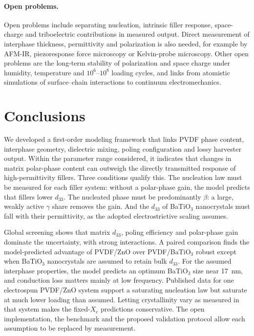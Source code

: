 \documentclass[11pt,a4paper]{article}
\newcommand{\BTO}{BaTiO$_3$}
\newcommand{\dt}{d_{33}}
\begin{document}
\paragraph{Open problems.} Open problems include separating nucleation, intrinsic filler response, space-charge and triboelectric contributions in measured output. Direct measurement of interphase thickness, permittivity and polarization is also needed, for example by AFM-IR, piezoresponse force microscopy or Kelvin-probe microscopy. Other open problems are the long-term stability of polarization and space charge under humidity, temperature and $10^6$--$10^8$ loading cycles, and links from atomistic simulations of surface--chain interactions to continuum electromechanics.

\section{Conclusions}
We developed a first-order modeling framework that links PVDF phase content, interphase geometry, dielectric mixing, poling configuration and lossy harvester output. Within the parameter range considered, it indicates that changes in matrix polar-phase content can outweigh the directly transmitted response of high-permittivity fillers. Three conditions qualify this. The nucleation law must be measured for each filler system: without a polar-phase gain, the model predicts that fillers lower $\dt$. The nucleated phase must be predominantly $\beta$: a large, weakly active $\gamma$ share removes the gain. And the $\dt$ of \BTO{} nanocrystals must fall with their permittivity, as the adopted electrostrictive scaling assumes.

Global screening shows that matrix $\dt$, poling efficiency and polar-phase gain dominate the uncertainty, with strong interactions. A paired comparison finds the model-predicted advantage of PVDF/ZnO over PVDF/\BTO{} robust except when \BTO{} nanocrystals are assumed to retain bulk $\dt$. For the assumed interphase properties, the model predicts an optimum \BTO{} size near 17~nm, and conduction loss matters mainly at low frequency. Published data for one electrospun PVDF/ZnO system support a saturating nucleation law but saturate at much lower loading than assumed. Letting crystallinity vary as measured in that system makes the fixed-$X_c$ predictions conservative. The open implementation, the benchmark and the proposed validation protocol allow each assumption to be replaced by measurement.
\end{document}
